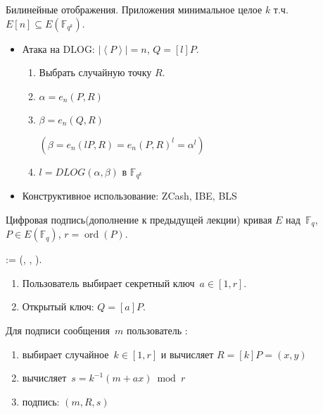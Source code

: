 \documentclass{beamer}
\begin{document}
\begin{frame}{Билинейные отображения. Приложения}
 минимальное целое $k$ т.ч. $E[n] \subseteq E(\mathbb{F}_{q^k})$.

\begin{itemize}
    \item Атака на DLOG: $|\left<P\right>| = n$, $Q = [l] P$.
    \begin{enumerate}
        \item Выбрать случайную точку $R$.
        \item $\alpha = e_n(P, R)$
        \item $\beta  = e_n(Q, R)$ \hfill 
        \begin{scriptsize}
        $(\beta = e_n(l P, R) = e_n(P, R)^l = \alpha^l)$
        \end{scriptsize}
        \item $l = DLOG(\alpha, \beta)$ в $\mathbb{F}_{q^k}$
    \end{enumerate}    
    \item Конструктивное использование: ZCash, IBE, BLS
\end{itemize}
\end{frame}

\begin{frame}{Цифровая подпись}{(дополнение к предыдущей лекции)}
	 кривая $E$ над~$\mathbb{F}_q$, $P \in E(\mathbb{F}_q)$, $r = \operatorname{ord}(P)$.
	
	\vspace{1em}
	 := (, , ).
	
	\vspace{1em}
	
	\begin{enumerate}
		\item Пользователь \structure{\faUserSecret} выбирает секретный ключ~$a \in [1, r]$.
		\item Открытый ключ: $Q = [a] P$.
	\end{enumerate}

	\vspace{1em}
	
	Для подписи сообщения~$m$ пользователь \structure{\faUserSecret}:
	\begin{enumerate}
		\item выбирает случайное~$k \in [1, r]$ и вычисляет $R = [k] P  = (x, y)$
		\item вычисляет~$s = k^{-1} (m + a x) \bmod{r}$
		\item подпись: $(m, R, s)$
	\end{enumerate}
\end{frame}
\end{document}
